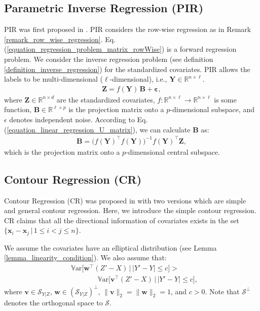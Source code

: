 \documentclass[lang=cn,10pt]{gorgeousnbook}
\numberwithin{equation}{section}%
\numberwithin{figure}{section}%
\begin{document}
\subsection{Parametric Inverse Regression (PIR)}

PIR was first proposed in \cite{bura2001estimating}. PIR considers the row-wise regression as in Remark \ref{remark_row_wise_regression}. Eq. (\ref{equation_regression_problem_matrix_rowWise}) is a forward regression problem. We consider the inverse regression problem (see definition \ref{definition_inverse_regression}) for the standardized covariates. PIR allows the labels to be multi-dimensional ($\ell$-dimensional), i.e., $\boldsymbol{Y} \in \mathbb{R}^{n \times \ell}$.
\begin{align*}
\boldsymbol{Z} = f(\boldsymbol{Y})\, \boldsymbol{B} + \boldsymbol{\varepsilon},
\end{align*}
where $\boldsymbol{Z} \in \mathbb{R}^{n \times d}$ are the standardized covariates, $f: \mathbb{R}^{n \times \ell} \rightarrow \mathbb{R}^{n \times \ell}$ is some function, $\boldsymbol{B} \in \mathbb{R}^{\ell \times p}$ is the projection matrix onto a $p$-dimensional subspace, and $\epsilon$ denotes independent noise.
According to Eq. (\ref{equation_linear_regression_U_matrix}), we can calculate $\boldsymbol{B}$ as:
\begin{align*}
\boldsymbol{B} = \big(f(\boldsymbol{Y})^\top f(\boldsymbol{Y})\big)^{-1} f(\boldsymbol{Y})^\top \boldsymbol{Z},
\end{align*}
which is the projection matrix onto a $p$-dimensional central subspace. 

\subsection{Contour Regression (CR)}

Contour Regression (CR) was proposed in \cite{li2005contour} with two versions which are simple and general contour regression. Here, we introduce the simple contour regression. 
CR claims that all the directional information of covariates exists in the set $\{\boldsymbol{x}_i - \boldsymbol{x}_j\, |\, 1 \leq i < j \leq n\}$.

We assume the covariates have an elliptical distribution (see Lemma \ref{lemma_linearity_condition}). 
We also assume that:
\begin{align*}
&\mathbb{V}\text{ar}\big[\boldsymbol{w}^\top (Z' - X)\, \big|\, |Y'-Y| \leq c\big] > \\
&~~~~~~~~~~~~~~~~~\mathbb{V}\text{ar}\big[\boldsymbol{v}^\top (Z' - X)\, \big|\, |Y'-Y| \leq c\big],
\end{align*}
where $\boldsymbol{v} \in \mathcal{S}_{Y|Z}$, $\boldsymbol{w} \in (\mathcal{S}_{Y|Z})^{\bot}$, $\|\boldsymbol{v}\|_2 = \|\boldsymbol{w}\|_2 = 1$, and $c > 0$. Note that $\mathcal{S}^{\bot}$ denotes the orthogonal space to $\mathcal{S}$.
\end{document}
